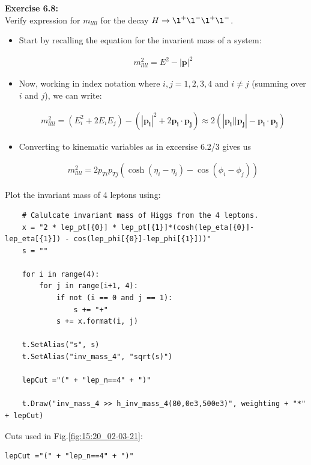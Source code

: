 \textbf{Exercise 6.8:}\\
Verify expression for $m_{llll}$ for the decay $H \rightarrow \l^+ \l^- \l^+ \l^- $.
\begin{itemize}
    \item{Start by recalling the equation for the invarient mass of a system:}
    
\begin{align}
    m_{llll}^2 = E^2 - |\mathbf{p}|^2
\end{align}

\item{Now, working in index notation where $i,j = 1,2,3,4$ and $i\neq j$ (summing over $i$ and $j$), we can write:}

\begin{align}
     m_{llll}^2 = (E_i^2+ 2E_iE_j) -(|\mathbf{p_i}|^2+2\mathbf{p_i\cdot p_j}) \approx 2(|\mathbf{p_i|| p_j}|-\mathbf{p_i\cdot p_j})
\end{align}     
\item{Converting to kinematic variables as in excersise 6.2/3 gives us}

\begin{align}
    m_{llll}^2 = 2p_{Ti}p_{Tj}\left(\cosh{(\eta_i-\eta_i)}- \cos{(\phi_i - \phi_j)}\right)
\end{align}
\end{itemize}


Plot the invariant mass of 4 leptons using:
\begin{lstlisting}
    # Calulcate invariant mass of Higgs from the 4 leptons.
    x = "2 * lep_pt[{0}] * lep_pt[{1}]*(cosh(lep_eta[{0}]-lep_eta[{1}]) - cos(lep_phi[{0}]-lep_phi[{1}]))"
    s = ""

    for i in range(4):
        for j in range(i+1, 4):
            if not (i == 0 and j == 1):
                s += "+"
            s += x.format(i, j)
 
    t.SetAlias("s", s)
    t.SetAlias("inv_mass_4", "sqrt(s)")

    lepCut ="(" + "lep_n==4" + ")"
    
    t.Draw("inv_mass_4 >> h_inv_mass_4(80,0e3,500e3)", weighting + "*" + lepCut)
\end{lstlisting}
Cuts used in Fig.\ref{fig:15:20_02-03-21}:
\begin{lstlisting}
lepCut ="(" + "lep_n==4" + ")"
\end{lstlisting}

